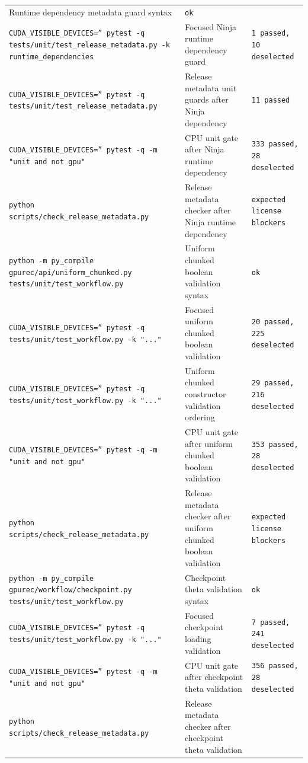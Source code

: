 \documentclass[11pt]{article}
\begin{document}
\begin{center}
\begin{tabular}{lll}
Runtime dependency metadata guard syntax &
\texttt{ok} \\
\texttt{CUDA\_VISIBLE\_DEVICES='' pytest -q tests/unit/test\_release\_metadata.py -k runtime\_dependencies} &
Focused Ninja runtime dependency guard &
\texttt{1 passed, 10 deselected} \\
\texttt{CUDA\_VISIBLE\_DEVICES='' pytest -q tests/unit/test\_release\_metadata.py} &
Release metadata unit guards after Ninja dependency &
\texttt{11 passed} \\
\texttt{CUDA\_VISIBLE\_DEVICES='' pytest -q -m "unit and not gpu"} &
CPU unit gate after Ninja runtime dependency &
\texttt{333 passed, 28 deselected} \\
\texttt{python scripts/check\_release\_metadata.py} &
Release metadata checker after Ninja runtime dependency &
\texttt{expected license blockers} \\
\texttt{python -m py\_compile gpurec/api/uniform\_chunked.py tests/unit/test\_workflow.py} &
Uniform chunked boolean validation syntax &
\texttt{ok} \\
\texttt{CUDA\_VISIBLE\_DEVICES='' pytest -q tests/unit/test\_workflow.py -k "..."} &
Focused uniform chunked boolean validation &
\texttt{20 passed, 225 deselected} \\
\texttt{CUDA\_VISIBLE\_DEVICES='' pytest -q tests/unit/test\_workflow.py -k "..."} &
Uniform chunked constructor validation ordering &
\texttt{29 passed, 216 deselected} \\
\texttt{CUDA\_VISIBLE\_DEVICES='' pytest -q -m "unit and not gpu"} &
CPU unit gate after uniform chunked boolean validation &
\texttt{353 passed, 28 deselected} \\
\texttt{python scripts/check\_release\_metadata.py} &
Release metadata checker after uniform chunked boolean validation &
\texttt{expected license blockers} \\
\texttt{python -m py\_compile gpurec/workflow/checkpoint.py tests/unit/test\_workflow.py} &
Checkpoint theta validation syntax &
\texttt{ok} \\
\texttt{CUDA\_VISIBLE\_DEVICES='' pytest -q tests/unit/test\_workflow.py -k "..."} &
Focused checkpoint loading validation &
\texttt{7 passed, 241 deselected} \\
\texttt{CUDA\_VISIBLE\_DEVICES='' pytest -q -m "unit and not gpu"} &
CPU unit gate after checkpoint theta validation &
\texttt{356 passed, 28 deselected} \\
\texttt{python scripts/check\_release\_metadata.py} &
Release metadata checker after checkpoint theta validation &

\end{tabular}
\end{center}
\end{document}
